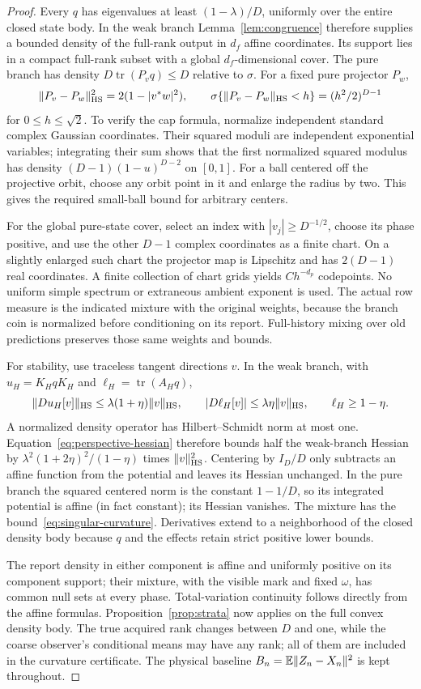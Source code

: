 \begin{proof}
Every $q$ has eigenvalues at least $(1-\lambda)/D$, uniformly over the entire closed state body. In the weak branch Lemma~\ref{lem:congruence} therefore supplies a bounded density of the full-rank output in $d_f$ affine coordinates. Its support lies in a compact full-rank subset with a global $d_f$-dimensional cover. The pure branch has density $D\operatorname{tr}(P_vq)\le D$ relative to $\sigma$. For a fixed pure projector $P_w$,
\[
 \|P_v-P_w\|_{\rm HS}^2=2(1-|v^*w|^2),\qquad
 \sigma\{\|P_v-P_w\|_{\rm HS}<h\}=(h^2/2)^{D-1}
\]
for $0\le h\le\sqrt2$. To verify the cap formula, normalize independent standard complex Gaussian coordinates. Their squared moduli are independent exponential variables; integrating their sum shows that the first normalized squared modulus has density $(D-1)(1-u)^{D-2}$ on $[0,1]$. For a ball centered off the projective orbit, choose any orbit point in it and enlarge the radius by two. This gives the required small-ball bound for arbitrary centers.

For the global pure-state cover, select an index with $|v_j|\ge D^{-1/2}$, choose its phase positive, and use the other $D-1$ complex coordinates as a finite chart. On a slightly enlarged such chart the projector map is Lipschitz and has $2(D-1)$ real coordinates. A finite collection of chart grids yields $Ch^{-d_p}$ codepoints. No uniform simple spectrum or extraneous ambient exponent is used. The actual row measure is the indicated mixture with the original weights, because the branch coin is normalized before conditioning on its report. Full-history mixing over old predictions preserves those same weights and bounds.

For stability, use traceless tangent directions $v$. In the weak branch, with $u_H=K_HqK_H$ and $\ell_H=\operatorname{tr}(A_Hq)$,
\[
 \|D u_H[v]\|_{\rm HS}\le\lambda(1+\eta)\|v\|_{\rm HS},\qquad
 |D\ell_H[v]|\le\lambda\eta\|v\|_{\rm HS},\qquad
 \ell_H\ge1-\eta.
\]
A normalized density operator has Hilbert--Schmidt norm at most one. Equation~\eqref{eq:perspective-hessian} therefore bounds half the weak-branch Hessian by $\lambda^2(1+2\eta)^2/(1-\eta)$ times $\|v\|_{\rm HS}^2$. Centering by $I_D/D$ only subtracts an affine function from the potential and leaves its Hessian unchanged. In the pure branch the squared centered norm is the constant $1-1/D$, so its integrated potential is affine (in fact constant); its Hessian vanishes. The mixture has the bound~\eqref{eq:singular-curvature}. Derivatives extend to a neighborhood of the closed density body because $q$ and the effects retain strict positive lower bounds.

The report density in either component is affine and uniformly positive on its component support; their mixture, with the visible mark and fixed $\omega$, has common null sets at every phase. Total-variation continuity follows directly from the affine formulas. Proposition~\ref{prop:strata} now applies on the full convex density body. The true acquired rank changes between $D$ and one, while the coarse observer's conditional means may have any rank; all of them are included in the curvature certificate. The physical baseline $B_n=\mathbb E\|Z_n-X_n\|^2$ is kept throughout.
\end{proof}
